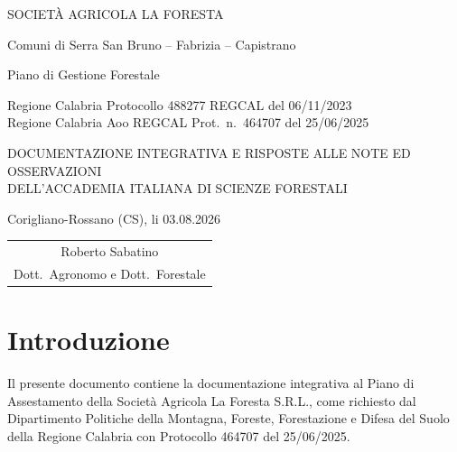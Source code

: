 \documentclass[a4paper,11pt]{article}
\newcommand{\pubdate}{03.08.2026}
\begin{document}
\begin{titlepage}
\rmfamily
\centering
\vspace*{1.5cm}

{\LARGE SOCIETÀ AGRICOLA LA FORESTA}
\vspace{0.8cm}

{\large Comuni di Serra San Bruno -- Fabrizia -- Capistrano}
\vspace{1.2cm}

{\LARGE Piano di Gestione Forestale}
\vspace{0.7cm}

{\large
Regione Calabria Protocollo 488277 REGCAL del 06/11/2023\\
Regione Calabria Aoo REGCAL Prot.\ n.\ 464707 del 25/06/2025
}
\vspace{1.2cm}

{\large
DOCUMENTAZIONE INTEGRATIVA E RISPOSTE ALLE NOTE ED OSSERVAZIONI\\
DELL'ACCADEMIA ITALIANA DI SCIENZE FORESTALI
}
\vspace{1.8cm}

{}
\vfill

\begin{flushleft}
Corigliano-Rossano (CS), li \pubdate
\end{flushleft}

\vspace{0.4cm}

\begin{flushright}
\begin{tabular}{c}
Roberto Sabatino\\
Dott.\ Agronomo e Dott.\ Forestale
\end{tabular}
\end{flushright}

\end{titlepage}

\section{Introduzione}

Il presente documento contiene la documentazione integrativa al Piano di Assestamento della Società Agricola La Foresta S.R.L., come richiesto dal Dipartimento Politiche della Montagna, Foreste, Forestazione e Difesa del Suolo della Regione Calabria con Protocollo 464707 del 25/06/2025.
\end{document}
